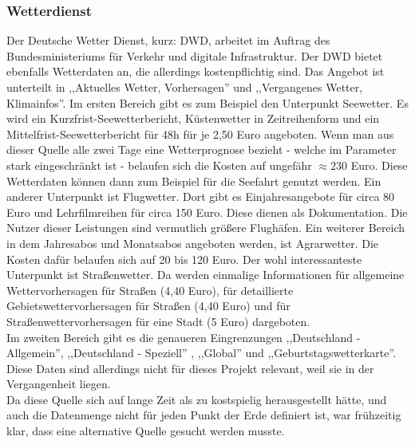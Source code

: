 \subsubsection*{Wetterdienst} %
Der Deutsche Wetter Dienst, kurz: DWD, arbeitet im Auftrag des
Bundesministeriums für Verkehr und digitale Infrastruktur. \cite{bmvi}
Der DWD bietet ebenfalls Wetterdaten an, die allerdings kostenpflichtig sind.
Das Angebot ist unterteilt in ,,Aktuelles Wetter, Vorhersagen''
und ,,Vergangenes Wetter, Klimainfos''.
Im ersten Bereich gibt es zum Beispiel den Unterpunkt Seewetter.
Es wird ein Kurzfrist-Seewetterbericht,
Küstenwetter in Zeitreihenform und ein Mittelfrist-Seewetterbericht
für 48h für je 2,50 Euro angeboten.
Wenn man aus dieser Quelle alle zwei Tage eine Wetterprognose
bezieht - welche im Parameter stark eingeschränkt ist - belaufen
sich die Kosten auf ungefähr $\approx 230$ Euro.
Diese Wetterdaten können dann zum Beispiel für die Seefahrt genutzt werden.
Ein anderer Unterpunkt ist Flugwetter.
Dort gibt es Einjahresangebote für circa 80 Euro und Lehrfilmreihen für circa 150 Euro.
Diese dienen als Dokumentation.
Die Nutzer dieser Leistungen sind vermutlich größere Flughäfen.
Ein weiterer Bereich in dem Jahresabos und Monatsabos angeboten werden, ist Agrarwetter.
Die Kosten dafür belaufen sich auf 20 bis 120 Euro.
Der wohl interessanteste Unterpunkt ist Straßenwetter.
Da werden einmalige Informationen für allgemeine Wettervorhersagen für Straßen (4,40 Euro),
für detaillierte Gebietswettervorhersagen für Straßen
(4,40 Euro) und für Straßenwettervorhersagen für eine Stadt (5 Euro) dargeboten.\\
Im zweiten Bereich gibt es die genaueren Eingrenzungen
,,Deutschland - Allgemein'', ,,Deutschland - Speziell'' ,
,,Global'' und ,,Geburtstagswetterkarte''.
\cite{dwd-shop}
Diese Daten sind allerdings nicht für dieses Projekt relevant,
weil sie in der Vergangenheit liegen.\\
Da diese Quelle sich auf lange Zeit als zu kostspielig herausgestellt hätte,
und auch die Datenmenge nicht für jeden Punkt der Erde definiert ist,
war frühzeitig klar, dass eine alternative Quelle gesucht werden musste.

